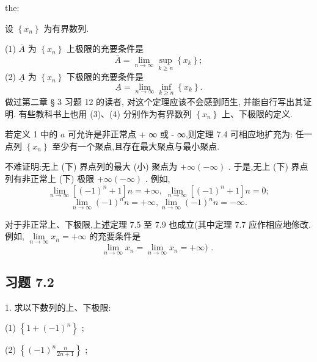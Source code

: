 \begin{theorem}{}{the:}

\end{theorem}
 设 \(\left\{  {x}_{n}\right\}\) 为有界数列.

(1) \(\bar{A}\) 为 \(\left\{  {x}_{n}\right\}\) 上极限的充要条件是
\[
\bar{A} = \mathop{\lim }\limits_{{n \rightarrow  \infty }}\mathop{\sup }\limits_{{k \geq  n}}\left\{  {x}_{k}\right\}  ; \tag{3}
\]
(2) \(\underline{A}\) 为 \(\left\{  {x}_{n}\right\}\) 下极限的充要条件是
\[
\underline{A} = \mathop{\lim }\limits_{{n \rightarrow  \infty }}\mathop{\inf }\limits_{{k \geq  n}}\left\{  {x}_{k}\right\}  . \tag{4}
\]
做过第二章 § 3 习题 12 的读者, 对这个定理应该不会感到陌生, 并能自行写出其证明. 有些教科书上也用 (3)、(4) 分别作为有界数列 \(\left\{  {x}_{n}\right\}\) 上、下极限的定义.

若定义 1 中的 \(a\) 可允许是非正常点 + ∞ 或 - ∞,则定理 7.4 可相应地扩充为: 任一点列 \(\left\{  {x}_{n}\right\}\) 至少有一个聚点,且存在最大聚点与最小聚点.

不难证明:无上 (下) 界点列的最大 (小) 聚点为 \(+ \infty \left( {-\infty }\right)\) . 于是,无上 (下) 界点列有非正常上 (下) 极限 \(+ \infty \left( {-\infty }\right)\) . 例如,
\[
\mathop{\lim }\limits_{{n \rightarrow  \infty }}\left\lbrack  {{\left( -1\right) }^{n} + 1}\right\rbrack  n =  + \infty ,\;\mathop{\lim }\limits_{{n \rightarrow  \infty }}\left\lbrack  {{\left( -1\right) }^{n} + 1}\right\rbrack  n = 0;
\]
\[
\mathop{\lim }\limits_{{n \rightarrow  \infty }}{\left( -1\right) }^{n}n =  + \infty ,\mathop{\lim }\limits_{{n \rightarrow  \infty }}{\left( -1\right) }^{n}n =  - \infty .
\]
\begin{remark}

\end{remark}
对于非正常上、下极限,上述定理 7.5 至 7.9 也成立(其中定理 7.7 应作相应地修改. 例如, \(\mathop{\lim }\limits_{{n \rightarrow  \infty }}{x}_{n} =  + \infty\) 的充要条件是
\[
\mathop{\lim }\limits_{{n \rightarrow  \infty }}{x}_{n} = \mathop{\lim }\limits_{{n \rightarrow  \infty }}{x}_{n} =  + \infty )\text{ . }
\]
\subsection{习题 7.2}

1. 求以下数列的上、下极限:

(1) \(\left\{  {1 + {\left( -1\right) }^{n}}\right\}\) ;

(2) \(\left\{  {{\left( -1\right) }^{n}\frac{n}{{2n} + 1}}\right\}\) ;

